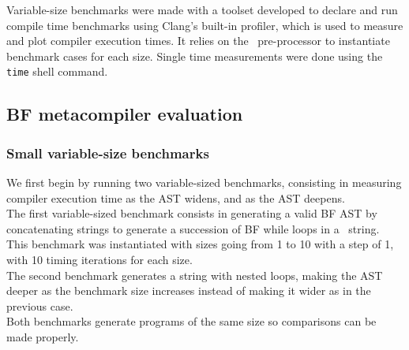 \documentclass[../../main.tex]{subfiles}
\begin{document}
Variable-size benchmarks were made with a toolset developed to declare and run
compile time benchmarks using Clang's built-in profiler, which is used to
measure and plot compiler execution times. It relies on the \cpp~pre-processor to
instantiate benchmark cases for each size.
Single time measurements were done using the \lstinline|time| shell command.

\subsection{BF metacompiler evaluation}

\subsubsection{Small variable-size benchmarks}

We first begin by running two variable-sized benchmarks, consisting in
measuring compiler execution time as the AST widens, and as the AST deepens.\\

The first variable-sized benchmark consists in generating a valid BF AST by
concatenating strings to generate a succession of BF while loops in a
\constexpr~string. This benchmark was instantiated with sizes going from 1 to
10 with a step of 1, with 10 timing iterations for each size.\\

The second benchmark generates a string with
nested loops, making the AST deeper as the benchmark size increases instead
of making it wider as in the previous case.\\

Both benchmarks generate programs of the same size so comparisons can be made
properly.
\end{document}

